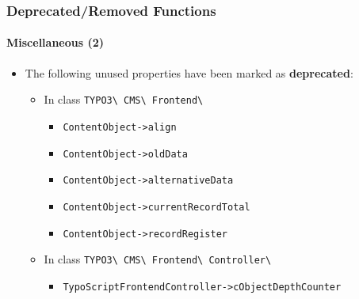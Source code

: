 %

\begin{frame}[fragile]
	\frametitle{Deprecated/Removed Functions}
	\framesubtitle{Miscellaneous (2)}


	\begin{itemize}
		\item The following unused properties have been marked as \textbf{deprecated}:
			\begin{itemize}\small
				\vspace{0.1cm}
				\item In class \texttt{TYPO3\textbackslash
					CMS\textbackslash
					Frontend\textbackslash}
					\begin{itemize}
						\item \texttt{ContentObject->align}
						\item \texttt{ContentObject->oldData}
						\item \texttt{ContentObject->alternativeData}
						\item \texttt{ContentObject->currentRecordTotal}
						\item \texttt{ContentObject->recordRegister}
					\end{itemize}
				\vspace{0.1cm}
				\item In class \texttt{TYPO3\textbackslash
					CMS\textbackslash
					Frontend\textbackslash
					Controller\textbackslash}
					\begin{itemize}
						\item \texttt{TypoScriptFrontendController->cObjectDepthCounter}
					\end{itemize}
			\end{itemize}\normalsize
	\end{itemize}

\end{frame}


